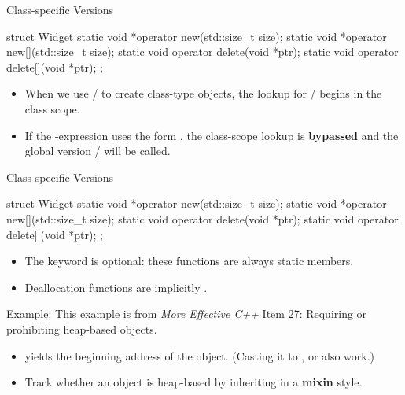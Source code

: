 \documentclass{beamer}
\begin{document}
\begin{frame}[fragile]{Class-specific Versions}
  \begin{cpp}[\small]
struct Widget {
  static void *operator new(std::size_t size);
  static void *operator new[](std::size_t size);
  static void operator delete(void *ptr);
  static void operator delete[](void *ptr);
};
  \end{cpp}
  \begin{itemize}
    \item When we use / to create class-type objects, the lookup for /\ttt{[]} begins in the class scope.
    \item If the -expression uses the form , the class-scope lookup is \textbf{bypassed} and the global version / will be called.
  \end{itemize}
\end{frame}

\begin{frame}[fragile]{Class-specific Versions}
  \begin{cpp}[\small]
struct Widget {
  static void *operator new(std::size_t size);
  static void *operator new[](std::size_t size);
  static void operator delete(void *ptr);
  static void operator delete[](void *ptr);
};
  \end{cpp}
  \begin{itemize}
    \item The keyword  is optional: these functions are always static members.
    \item Deallocation functions are implicitly .
  \end{itemize}
\end{frame}

\begin{frame}[fragile]{Example: }
  This example is from \textit{More Effective C++} Item 27: Requiring or prohibiting heap-based objects.
  \begin{itemize}
    \item {} yields the beginning address of the object. (Casting it to ,  or  also work.)
    \item Track whether an object is heap-based by inheriting  in a \textbf{mixin} style.
  \end{itemize}
\end{frame}
\end{document}
